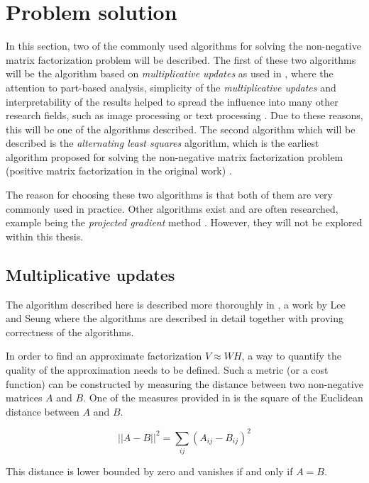\documentclass[thesis=M,english]{FITthesis}[2012/10/20]
\begin{document}
\section{Problem solution}
In this section, two of the commonly used algorithms for solving the
non-negative matrix factorization problem will be described. The
first of these two algorithms will be the algorithm based on
\emph{multiplicative updates} as used in \cite{lee99}, where the
attention to part-based analysis, simplicity of the \emph{multiplicative
updates} and interpretability of the results helped to spread the influence
into many other research fields, such as image processing or text
processing \cite{nmf-phd-thesis}. Due to these reasons, this will be one of the algorithms
described. The second algorithm which will be described is the \emph{alternating
least squares} algorithm, which is the earliest algorithm proposed for solving
the non-negative matrix factorization problem (positive matrix factorization
in the original work) \cite{nmf-paatero}.

The reason for choosing these two algorithms is that both of them are very
commonly used in practice. Other algorithms exist and are often researched,
example being the \emph{projected gradient} method \cite{projected-gradient}.
However, they will not be explored within this thesis.

\subsection{Multiplicative updates}
The algorithm described here is described more thoroughly in \cite{lee-algos},
a work by Lee and Seung where the algorithms are described in detail together
with proving correctness of the algorithms.

In order to find an approximate factorization $V \approx WH$, a way to
quantify the quality of the approximation needs to be defined. Such a metric
(or a cost function) can be constructed by measuring the distance between
two non-negative matrices $A$ and $B$. One of the measures provided in
\cite{lee-algos} is the square of the Euclidean distance between $A$ and $B$.

\begin{equation}
||A - B||^2 = \sum_{ij}(A_{ij} - B_{ij})^2
\end{equation}

This distance is lower bounded by zero and vanishes if and only if $A = B$.
\end{document}
